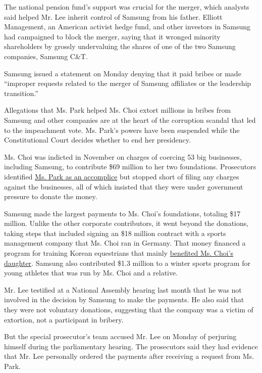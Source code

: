 The national pension fund's support was crucial for the merger, which
analysts said helped Mr. Lee inherit control of Samsung from his father.
Elliott Management, an American activist hedge fund, and other investors
in Samsung had campaigned to block the merger, saying that it wronged
minority shareholders by grossly undervaluing the shares of one of the
two Samsung companies, Samsung C\&T.

Samsung issued a statement on Monday denying that it paid bribes or made
``improper requests related to the merger of Samsung affiliates or the
leadership transition.''

Allegations that Ms. Park helped Ms. Choi extort millions in bribes from
Samsung and other companies are at the heart of the corruption scandal
that led to the impeachment vote. Ms. Park's powers have been suspended
while the Constitutional Court decides whether to end her presidency.

Ms. Choi was indicted in November on charges of coercing 53 big
businesses, including Samsung, to contribute \$69 million to her two
foundations. Prosecutors identified
\href{https://www.nytimes3xbfgragh.onion/2016/11/20/world/asia/park-geun-hye-south-korea-extortion-accomplice-prosecutors.html}{Ms.
Park as an accomplice} but stopped short of filing any charges against
the businesses, all of which insisted that they were under government
pressure to donate the money.

Samsung made the largest payments to Ms. Choi's foundations, totaling
\$17 million. Unlike the other corporate contributors, it went beyond
the donations, taking steps that included signing an \$18 million
contract with a sports management company that Ms. Choi ran in Germany.
That money financed a program for training Korean equestrians that
mainly
\href{https://www.nytimes3xbfgragh.onion/2017/01/02/world/asia/south-korea-scandal-choi-soon-sil-daughter.html}{benefited
Ms. Choi's daughter}. Samsung also contributed \$1.3 million to a winter
sports program for young athletes that was run by Ms. Choi and a
relative.

Mr. Lee testified at a National Assembly hearing last month that he was
not involved in the decision by Samsung to make the payments. He also
said that they were not voluntary donations, suggesting that the company
was a victim of extortion, not a participant in bribery.

But the special prosecutor's team accused Mr. Lee on Monday of perjuring
himself during the parliamentary hearing. The prosecutors said they had
evidence that Mr. Lee personally ordered the payments after receiving a
request from Ms. Park.

